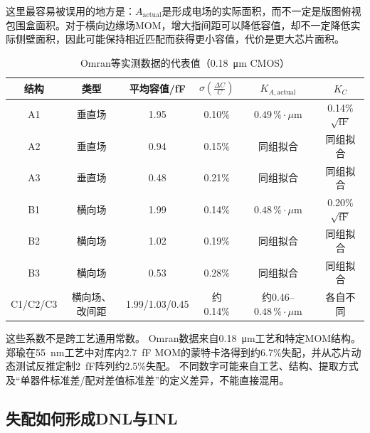 \documentclass[UTF8,a4paper,11pt]{ctexart}
\newcommand{\sigc}{\sigma\!\left(\frac{\Delta C}{C}\right)}
\begin{document}
这里最容易被误用的地方是：$A_{\mathrm{actual}}$是形成电场的实际面积，而不一定是版图俯视包围盒面积。对于横向边缘场MOM，增大指间距可以降低容值，却不一定降低实际侧壁面积，因此可能保持相近匹配而获得更小容值，代价是更大芯片面积。

\begin{table}[H]
\centering
\caption{Omran等实测数据的代表值（\SI{0.18}{\micro\metre} CMOS）}
\label{tab:omran_data}
\begin{tabular}{cccccc}
\toprule
结构 & 类型 & 平均容值/fF & $\sigc$ & $K_{A,\mathrm{actual}}$ & $K_C$\\
\midrule
A1 & 垂直场 & 1.95 & 0.10\% & $0.49\,\%\!\cdot\!\mu\mathrm{m}$ & 0.14\%$\sqrt{\mathrm{fF}}$\\
A2 & 垂直场 & 0.94 & 0.15\% & 同组拟合 & 同组拟合\\
A3 & 垂直场 & 0.48 & 0.21\% & 同组拟合 & 同组拟合\\
B1 & 横向场 & 1.99 & 0.14\% & $0.48\,\%\!\cdot\!\mu\mathrm{m}$ & 0.20\%$\sqrt{\mathrm{fF}}$\\
B2 & 横向场 & 1.02 & 0.19\% & 同组拟合 & 同组拟合\\
B3 & 横向场 & 0.53 & 0.28\% & 同组拟合 & 同组拟合\\
C1/C2/C3 & 横向场、改间距 & 1.99/1.03/0.45 & 约0.14\% & 约0.46--$0.48\,\%\!\cdot\!\mu\mathrm{m}$ & 各自不同\\
\bottomrule
\end{tabular}
\end{table}

\begin{warnbox}{这些系数不是跨工艺通用常数。}
Omran数据来自\SI{0.18}{\micro\metre}工艺和特定MOM结构。郑瑜在\SI{55}{nm}工艺中对库内\SI{2.7}{fF} MOM的蒙特卡洛得到约6.7\%失配，并从芯片动态测试反推定制\SI{2}{fF}阵列约2.5\%失配。\cite{zheng2024} 不同数字可能来自工艺、结构、提取方式及“单器件标准差/配对差值标准差”的定义差异，不能直接混用。
\end{warnbox}

\subsection{失配如何形成DNL与INL}
\end{document}
